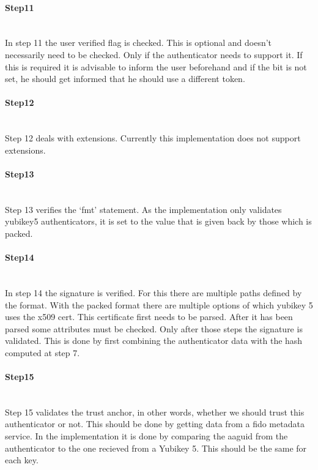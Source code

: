 \documentclass[a4paper, 11pt]{scrartcl}
\begin{document}
\paragraph{Step11}\hfill \\ 
In step 11 the user verified flag is checked. This is optional and doesn't necessarily need to be checked. Only if the authenticator needs to support it. If this is required it is advisable to inform the user beforehand and if the bit is not set, he should get informed that he should use a different token.

\paragraph{Step12}\hfill \\ 
Step 12 deals with extensions. Currently this implementation does not support extensions.

\paragraph{Step13}\hfill \\ 
Step 13 verifies the `fmt' statement. As the implementation only validates yubikey5 authenticators, it is set to the value that is given back by those which is packed.

\paragraph{Step14}\hfill \\ 
In step 14 the signature is verified. For this there are multiple paths defined by the format. With the packed format there are multiple options of which yubikey 5 uses the x509 cert. This certificate first needs to be parsed. After it has been parsed some attributes must be checked. Only after those steps the signature is validated. This is done by first combining the authenticator data with the hash computed at step 7.

\paragraph{Step15}\hfill \\ 
Step 15 validates the trust anchor, in other words, whether we should trust this authenticator or not. This should be done by getting data from a fido metadata service. In the implementation it is done by comparing the aaguid from the authenticator to the one recieved from a Yubikey 5. This should be the same for each key.
\end{document}
